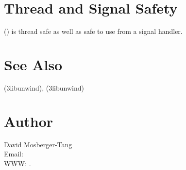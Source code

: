 \documentclass{article}
\begin{document}
\section{Thread and Signal Safety}

() is thread safe as well as safe to use
from a signal handler.

\section{See Also}

(3libunwind),
(3libunwind)

\section{Author}

\noindent
David Mosberger-Tang\\
Email: \\
WWW: .
\LatexManEnd
\end{document}
